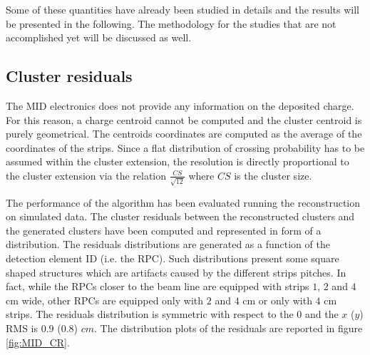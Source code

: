 Some of these quantities have already been studied in details and the results will be presented in the following.
The methodology for the studies that are not accomplished yet will be discussed as well.

\subsection{Cluster residuals}

The MID electronics does not provide any information on the deposited charge. 
For this reason, a charge centroid cannot be computed and the cluster centroid is purely geometrical.
The centroids coordinates are computed as the average of the coordinates of the strips.
Since a flat distribution of crossing probability has to be assumed within the cluster extension, the resolution is directly proportional to the cluster extension via the relation $\frac{CS}{\sqrt{12}}$ where $CS$ is the cluster size.

The performance of the algorithm has been evaluated running the reconstruction on simulated data.
The cluster residuals between the reconstructed clusters and the generated clusters have been computed and represented in form of a distribution.
The residuals distributions are generated as a function of the detection element ID (i.e. the RPC).
Such distributions present some square shaped structures which are artifacts caused by the different strips pitches.
In fact, while the RPCs closer to the beam line are equipped with strips $1$, $2$ and $4$ cm wide, other RPCs are equipped only with $2$ and $4$ cm or only with $4$ cm strips.
The residuals distribution is symmetric with respect to the $0$ and the $x$ ($y$) RMS is $0.9$ ($0.8$) $cm$.
The distribution plots of the residuals are reported in figure \ref{fig:MID_CR}.

